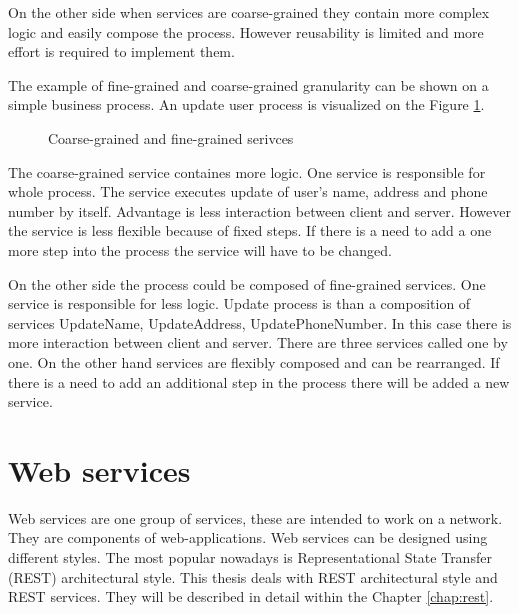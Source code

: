On the other side when services are coarse-grained they contain more complex logic and easily compose the process. However reusability is limited and more effort is required to implement them.

The example of fine-grained and coarse-grained granularity can be shown on a simple business process. An update user process is visualized on the Figure \ref{fig:granularity}.

\begin{figure}[htp] 
\caption{Coarse-grained and fine-grained serivces}
\label{fig:granularity}
\end{figure}

The coarse-grained service containes more logic. One service is responsible for whole process. The service executes update of user's name, address and phone number by itself. Advantage is less interaction between client and server. However the service is less flexible because of fixed steps. If there is a need to add a one more step into the process the service will have to be changed.

On the other side the process could be composed of fine-grained services. One service is responsible for less logic. Update process is than a composition of services UpdateName, UpdateAddress, UpdatePhoneNumber. In this case there is more interaction between client and server. There are three services called one by one. On the other hand services are flexibly composed and can be rearranged. If there is a need to add an additional step in the process there will be added a new service.


\section{Web services}
Web services are one group of services, these are intended to work on a network. They are components of \gls{web-applications}. Web services can be designed using different styles. The most popular nowadays is Representational State Transfer (REST) architectural style. This thesis deals with REST architectural style and REST services. They will be described in detail within the Chapter \ref{chap:rest}.


